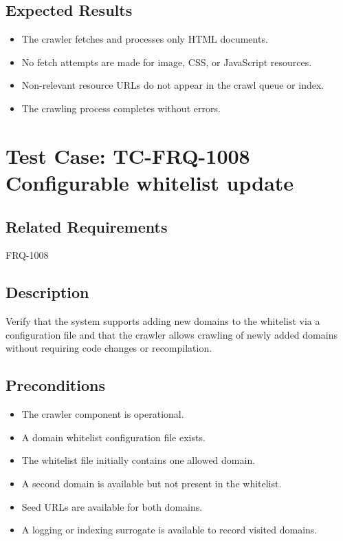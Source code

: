 \documentclass{article}
\begin{document}
\subsection*{Expected Results}
\begin{itemize}
  \item The crawler fetches and processes only HTML documents.
  \item No fetch attempts are made for image, CSS, or JavaScript resources.
  \item Non-relevant resource URLs do not appear in the crawl queue or index.
  \item The crawling process completes without errors.
\end{itemize}


\section{Test Case: TC-FRQ-1008 \newline Configurable whitelist update }

\subsection*{Related Requirements}
FRQ-1008

\subsection*{Description}
Verify that the system supports adding new domains to the whitelist via a configuration file 
and that the crawler allows crawling of newly added domains without requiring code changes or recompilation.

\subsection*{Preconditions}
\begin{itemize}
  \item The crawler component is operational.
  \item A domain whitelist configuration file exists.
  \item The whitelist file initially contains one allowed domain.
  \item A second domain is available but not present in the whitelist.
  \item Seed URLs are available for both domains.
  \item A logging or indexing surrogate is available to record visited domains.
\end{itemize}
\end{document}
